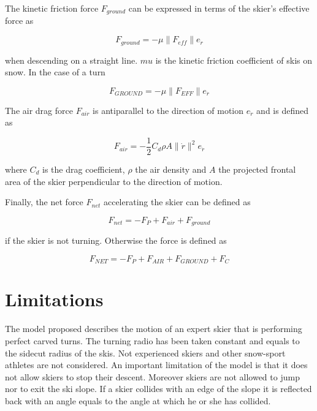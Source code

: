 \documentclass[12pt,a4paper,twoside]{book}
\newcommand{\norm}[1]{\lVert#1\rVert}
\begin{document}
The kinetic friction force $F_{ground}$ can be expressed in terms of the skier's effective force as

\begin{equation}
F_{ground}=-\mu \norm{F_{eff}}e_{\dot{r}}
\end{equation}

when descending on a straight line. $mu$ is the kinetic friction coefficient of skis on snow. In the case of a turn

\begin{equation}
F_{GROUND}=-\mu \norm{F_{EFF}}e_{\dot{r}}
\end{equation}

The air drag force $F_{air}$ is antiparallel to the direction of motion $e_{\dot{r}}$ and is defined as

\begin{equation}
F_{air}=-\frac{1}{2}C_d \rho A \norm{\dot{r}}^2 e_{\dot{r}}
\end{equation}

where $C_d$ is the drag coefficient, $\rho$ the air density and $A$ the projected frontal area of the skier perpendicular to the direction of motion.

Finally, the net force $F_{net}$ accelerating the skier can be defined as

\begin{equation}
F_{net}=-F_P + F_{air} + F_{ground}
\end{equation}

if the skier is not turning. Otherwise the force is defined as

\begin{equation}
F_{NET}=-F_P + F_{AIR} + F_{GROUND} + F_C
\end{equation}


\section{Limitations}
The model proposed describes the motion of an expert skier that is performing perfect carved turns. The turning radio has been taken constant and equals to the sidecut radius of the skis. Not experienced skiers and other snow-sport athletes are not considered. An important limitation of the model is that it does not allow skiers to stop their descent.  Moreover skiers are not allowed to jump nor to exit the ski slope. If a skier collides with an edge of the slope it is reflected back with an angle equals to the angle at which he or she has collided.
\end{document}
